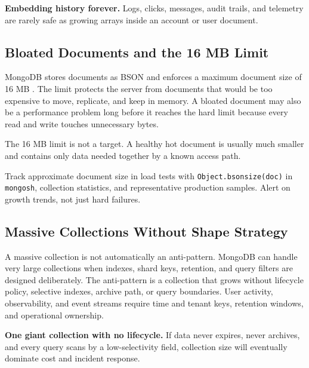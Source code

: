 \begin{pitfall}
\textbf{Embedding history forever.} Logs, clicks, messages, audit trails, and telemetry are rarely safe as growing arrays inside an account or user document.
\end{pitfall}

\subsection{Bloated Documents and the 16 MB Limit}
MongoDB stores documents as BSON and enforces a maximum document size of 16 MB \cite{mongodbLimitsDocs}. The limit protects the server from documents that would be too expensive to move, replicate, and keep in memory. A bloated document may also be a performance problem long before it reaches the hard limit because every read and write touches unnecessary bytes.

\begin{notebox}
The 16 MB limit is not a target. A healthy hot document is usually much smaller and contains only data needed together by a known access path.
\end{notebox}

\begin{tipbox}
Track approximate document size in load tests with \texttt{Object.bsonsize(doc)} in \texttt{mongosh}, collection statistics, and representative production samples. Alert on growth trends, not just hard failures.
\end{tipbox}

\subsection{Massive Collections Without Shape Strategy}
A massive collection is not automatically an anti-pattern. MongoDB can handle very large collections when indexes, shard keys, retention, and query filters are designed deliberately. The anti-pattern is a collection that grows without lifecycle policy, selective indexes, archive path, or query boundaries. User activity, observability, and event streams require time and tenant keys, retention windows, and operational ownership.

\begin{pitfall}
\textbf{One giant collection with no lifecycle.} If data never expires, never archives, and every query scans by a low-selectivity field, collection size will eventually dominate cost and incident response.
\end{pitfall}


